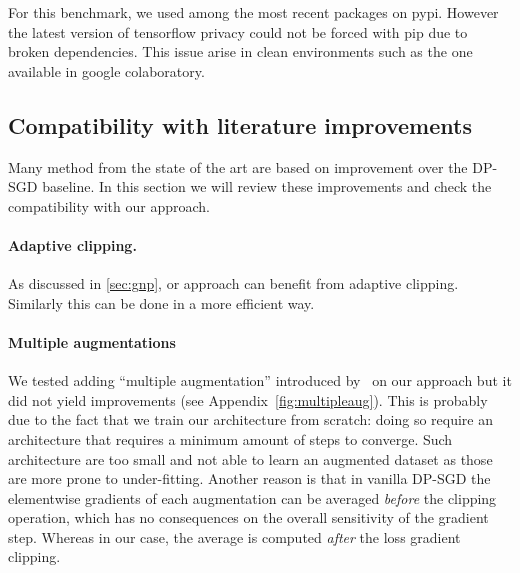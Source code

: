 For this benchmark, we used among the most recent packages on pypi. However the latest version of tensorflow privacy could not be forced with pip due to broken dependencies. This issue arise in clean environments such as the one available in google colaboratory.


\subsection{Compatibility with literature improvements}

Many method from the state of the art are based on improvement over the DP-SGD baseline. In this section we will review these improvements and check the compatibility with our approach.

\paragraph{Adaptive clipping.} As discussed in \ref{sec:gnp}, or approach can benefit from adaptive clipping. Similarly this can be done in a more efficient way.

\paragraph{Multiple augmentations} We tested adding ``multiple augmentation'' introduced by~\cite{de2022unlocking} on our approach but it did not yield improvements (see Appendix~\ref{fig:multipleaug}). This is probably due to the fact that we train our architecture from scratch: doing so require an architecture that requires a minimum amount of steps to converge. Such architecture are too small and not able to learn an augmented dataset as those are more prone to under-fitting.  Another reason is that in vanilla DP-SGD the elementwise gradients of each augmentation can be averaged \textit{before} the clipping operation, which has no consequences on the overall sensitivity of the gradient step. Whereas in our case, the average is computed \textit{after} the loss gradient clipping.

